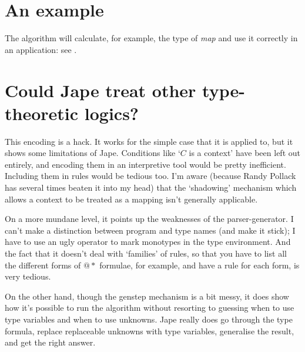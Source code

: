 \section{An example}

The algorithm will calculate, for example, the type of \textit{map} and use it correctly in an application: see .

\section{Could Jape treat other type-theoretic logics?}

This encoding is a hack. It works for the simple case that it is applied to, but it shows some limitations of Jape. Conditions like `$C$ is a context' have been left out entirely, and encoding them in an interpretive tool would be pretty inefficient. Including them in rules would be tedious too. I'm aware (because Randy Pollack has several times beaten it into my head) that the `shadowing' mechanism which allows a context to be treated as a mapping isn't generally applicable.

On a more mundane level, it points up the weaknesses of the parser-generator. I can't make a distinction between program and type names (and make it stick); I have to use an ugly operator to mark monotypes in the type environment. And the fact that it doesn't deal with `families' of rules, so that you have to list all the different forms of $@*$ formulae, for example, and have a rule for each form, is very tedious.

On the other hand, though the genstep mechanism is a bit messy, it does show how it's possible to run the algorithm without resorting to guessing when to use type variables and when to use unknowns. Jape really does go through the type formula, replace replaceable unknowns with type variables, generalise the result, and get the right answer.


